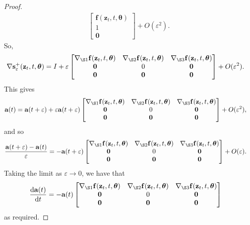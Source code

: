\documentclass[10pt]{article}
\newcommand{\dee}{\mathrm{d}}
\newcommand{\ve}[1]{\mathbf{#1}}
\newcommand{\ves}[1]{\boldsymbol{#1}}
\begin{document}
\begin{itemize}
\begin{proof}
\begin{align*}
\begin{bmatrix}
        \ve{f}(\ve{z}_t, t, \ves{\theta}) \\
        1 \\
        \ve{0}
      \end{bmatrix} 
      + O(\varepsilon^2).      
    \end{align*}
    So,
    \begin{align*}
      \nabla \ve{s}^+_\varepsilon(\ve{z}_t, t, \ves{\theta})
      &= I + \varepsilon \begin{bmatrix}
        \nabla_{\S1}\ve{f}(\ve{z}_t, t, \ves{\theta})
        & \nabla_{\S2}\ve{f}(\ve{z}_t, t, \ves{\theta})
        & \nabla_{\S3}\ve{f}(\ve{z}_t, t, \ves{\theta}) \\
        \ve{0} & 0 & \ve{0} \\
        \ve{0} & \ve{0} & \ve{0}
      \end{bmatrix} + O(\varepsilon^2).
    \end{align*}
    This gives
    \begin{align*}
      \ve{a}(t) 
      &= \ve{a}(t + \varepsilon) 
      + \varepsilon \ve{a}(t + \varepsilon) \begin{bmatrix}
        \nabla_{\S1}\ve{f}(\ve{z}_t, t, \ves{\theta})
        & \nabla_{\S2}\ve{f}(\ve{z}_t, t, \ves{\theta})
        & \nabla_{\S3}\ve{f}(\ve{z}_t, t, \ves{\theta}) \\
        \ve{0} & 0 & \ve{0} \\
        \ve{0} & \ve{0} & \ve{0}
      \end{bmatrix} + O(\varepsilon^2),
    \end{align*}
    and so
    \begin{align*}
      \frac{\ve{a}(t+\varepsilon) - \ve{a}(t)}{\varepsilon} 
      &= -\ve{a}(t + \varepsilon) \begin{bmatrix}
        \nabla_{\S1}\ve{f}(\ve{z}_t, t, \ves{\theta})
        & \nabla_{\S2}\ve{f}(\ve{z}_t, t, \ves{\theta})
        & \nabla_{\S3}\ve{f}(\ve{z}_t, t, \ves{\theta}) \\
        \ve{0} & 0 & \ve{0} \\
        \ve{0} & \ve{0} & \ve{0}
      \end{bmatrix} + O(\varepsilon).
    \end{align*}
    Taking the limit as $\varepsilon \rightarrow 0$, we have that
    \begin{align*}
      \frac{\dee \ve{a}(t)}{\dee t}
      &= -\ve{a}(t) \begin{bmatrix}
        \nabla_{\S1}\ve{f}(\ve{z}_t, t, \ves{\theta})
        & \nabla_{\S2}\ve{f}(\ve{z}_t, t, \ves{\theta})
        & \nabla_{\S3}\ve{f}(\ve{z}_t, t, \ves{\theta}) \\
        \ve{0} & 0 & \ve{0} \\
        \ve{0} & \ve{0} & \ve{0}
      \end{bmatrix}
    \end{align*}
    as required.
  \end{proof}


\end{itemize}
\end{document}
